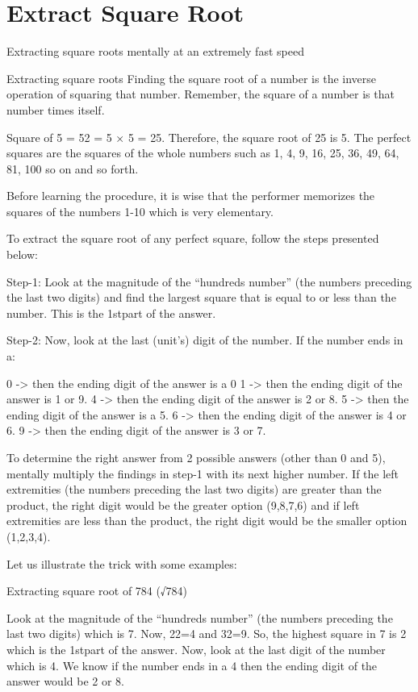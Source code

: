 
\section*{Extract Square Root}

Extracting square roots mentally at an extremely fast speed

Extracting square roots
Finding the square root of a number is the inverse operation of squaring that number. Remember, the square of a number is that number times itself.
 
Square of 5 = 52 = 5 × 5 = 25. Therefore, the square root of 25 is 5. The perfect squares are the squares of the whole numbers such as 1, 4, 9, 16, 25, 36, 49, 64, 81, 100 so on and so forth.

Before learning the procedure, it is wise that the performer memorizes the squares of the numbers 1-10 which is very elementary.

To extract the square root of any perfect square, follow the steps presented below:

Step-1:  Look at the magnitude of the “hundreds number” (the numbers preceding the last two digits) and find the largest square that is equal to or less than the number. This is the 1stpart of the answer.

Step-2:  Now, look at the last (unit’s) digit of the number. If the number ends in a:

0 -> then the ending digit of the answer is a 0
1 -> then the ending digit of the answer is 1 or 9.
4 -> then the ending digit of the answer is 2 or 8.
5 -> then the ending digit of the answer is a 5.
6 -> then the ending digit of the answer is 4 or 6.
9 -> then the ending digit of the answer is 3 or 7.

To determine the right answer from 2 possible answers (other than 0 and 5), mentally multiply the findings in step-1 with its next higher number. If the left extremities (the numbers preceding the last two digits) are greater than the product, the right digit would be the greater option (9,8,7,6) and if left extremities are less than the product, the right digit would be the smaller option (1,2,3,4).

Let us illustrate the trick with some examples:

Extracting square root of 784 (√784)

    Look at the magnitude of the “hundreds number” (the numbers preceding the last two digits) which is 7. Now, 22=4 and 32=9. So, the highest square in 7 is 2 which is the 1stpart of the answer.
    Now, look at the last digit of the number which is 4. We know if the number ends in a 4 then the ending digit of the answer would be 2 or 8.

